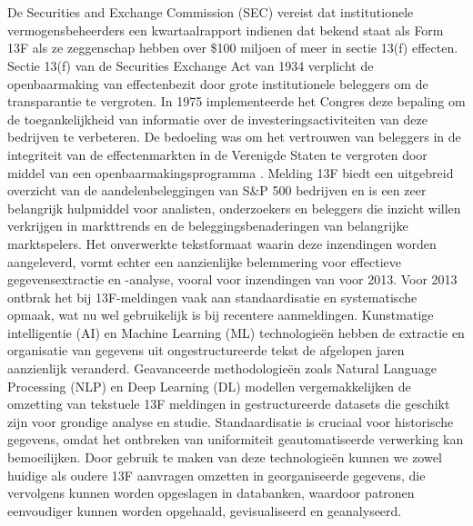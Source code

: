 \chapter{}%
\label{ch:stand-van-zaken}



De Securities and Exchange Commission (SEC) vereist dat institutionele vermogensbeheerders een kwartaalrapport indienen dat bekend staat als Form 13F als ze zeggenschap hebben over \$100 miljoen of meer in sectie 13(f) effecten. Sectie 13(f) van de Securities Exchange Act van 1934 verplicht de openbaarmaking van effectenbezit door grote institutionele beleggers om de transparantie te vergroten. In 1975 implementeerde het Congres deze bepaling om de toegankelijkheid van informatie over de investeringsactiviteiten van deze bedrijven te verbeteren. De bedoeling was om het vertrouwen van beleggers in de integriteit van de effectenmarkten in de Verenigde Staten te vergroten door middel van een openbaarmakingsprogramma \textcite{SECform13F2024}.
Melding 13F biedt een uitgebreid overzicht van de aandelenbeleggingen van S\&P 500 bedrijven en is een zeer belangrijk hulpmiddel voor analisten, onderzoekers en beleggers die inzicht willen verkrijgen in markttrends en de beleggingsbenaderingen van belangrijke marktspelers. Het onverwerkte tekstformaat waarin deze inzendingen worden aangeleverd, vormt echter een aanzienlijke belemmering voor effectieve gegevensextractie en -analyse, vooral voor inzendingen van voor 2013. Voor 2013 ontbrak het bij 13F-meldingen vaak aan standaardisatie en systematische opmaak, wat nu wel gebruikelijk is bij recentere aanmeldingen.
Kunstmatige intelligentie (AI) en Machine Learning (ML) technologieën hebben de extractie en organisatie van gegevens uit ongestructureerde tekst de afgelopen jaren aanzienlijk veranderd. Geavanceerde methodologieën zoals Natural Language Processing (NLP) en Deep Learning (DL) modellen vergemakkelijken de omzetting van tekstuele 13F meldingen in gestructureerde datasets die geschikt zijn voor grondige analyse en studie. Standaardisatie is cruciaal voor historische gegevens, omdat het ontbreken van uniformiteit geautomatiseerde verwerking kan bemoeilijken. Door gebruik te maken van deze technologieën kunnen we zowel huidige als oudere 13F aanvragen omzetten in georganiseerde gegevens, die vervolgens kunnen worden opgeslagen in databanken, waardoor patronen eenvoudiger kunnen worden opgehaald, gevisualiseerd en geanalyseerd.
\\


